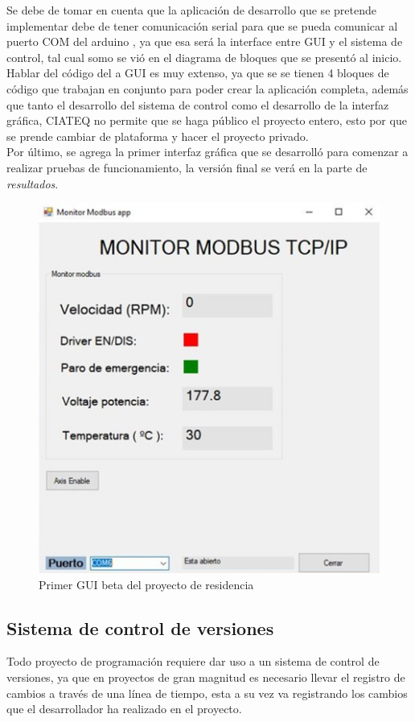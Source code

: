 \documentclass[12pt,titlepage]{article}
\begin{document}
Se debe de tomar en cuenta que la aplicación de desarrollo que se pretende implementar debe de tener comunicación serial para que se pueda comunicar al puerto COM del arduino , ya que esa será la interface entre GUI y el sistema de control, tal cual somo se vió en el diagrama de bloques que se presentó al inicio. \\

Hablar del código del a GUI es muy extenso, ya que se se tienen 4 bloques de código que trabajan en conjunto para poder crear la aplicación completa, además que tanto el desarrollo del sistema de control como el desarrollo de la interfaz gráfica, CIATEQ no permite que se haga público el proyecto entero, esto por que se prende cambiar de plataforma y hacer el proyecto privado. \\ 

Por último, se agrega la primer interfaz gráfica que se desarrolló para comenzar a realizar pruebas de funcionamiento, la versión final se verá en la parte de \textit{resultados}. \\ 

\begin{figure}[htbp]
\hspace*{4.8cm} 
\includegraphics[scale=0.64]{gui_ini}
\caption{Primer GUI beta del proyecto de residencia}
\end{figure}
\newpage
\subsection{Sistema de control de versiones}
Todo proyecto de programación requiere dar uso a un sistema de control de versiones, ya que en proyectos de gran magnitud es necesario llevar el registro de cambios a través de una línea de tiempo, esta a su vez va registrando los cambios que el desarrollador ha realizado en el proyecto. \\
\end{document}
